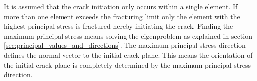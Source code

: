 It is assumed that the crack initiation only occurs within a single
element. If more than one element exceeds the fracturing limit only the
element with the highest principal stress is fractured hereby
initiating the crack. Finding the maximum principal stress means
solving the eigenproblem as explained in section
\vref{sec:principal_values_and_directions}. The maximum principal
stress direction defines the normal vector to the initial crack
plane. This means the orientation of the initial crack plane is completely
determined by the maximum principal stress direction.


\begin{figure}[h]
\centering
     \\
\end{figure}
